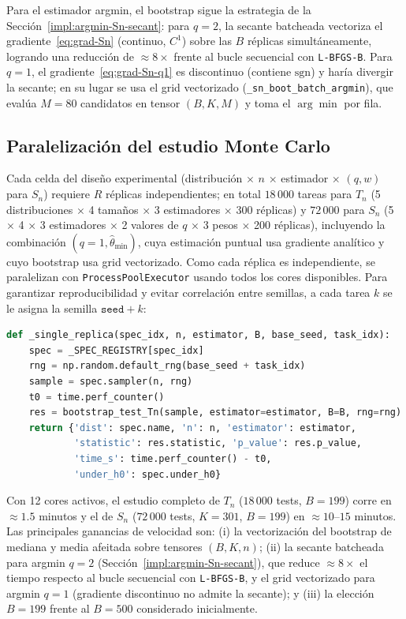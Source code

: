 Para el estimador argmin, el bootstrap sigue la estrategia de la Sección~\ref{impl:argmin-Sn-secant}: para $q=2$, la secante batcheada vectoriza el gradiente~\eqref{eq:grad-Sn} (continuo, $C^1$) sobre las $B$ réplicas simultáneamente, logrando una reducción de $\approx\!8\times$ frente al bucle secuencial con \texttt{L-BFGS-B}. Para $q=1$, el gradiente~\eqref{eq:grad-Sn-q1} es discontinuo (contiene $\mathrm{sgn}$) y haría divergir la secante; en su lugar se usa el grid vectorizado (\texttt{\_sn\_boot\_batch\_argmin}), que evalúa $M=80$ candidatos en tensor $(B,K,M)$ y toma el $\arg\min$ por fila.

\subsection{Paralelización del estudio Monte Carlo}

Cada celda del diseño experimental (distribución $\times$ $n$ $\times$ estimador $\times$ $(q,w)$ para $S_n$) requiere $R$ réplicas independientes; en total $18\,000$ tareas para $T_n$ (5 distribuciones $\times$ 4 tamaños $\times$ 3 estimadores $\times$ 300 réplicas) y $72\,000$ para $S_n$ (5 $\times$ 4 $\times$ 3 estimadores $\times$ 2 valores de $q$ $\times$ 3 pesos $\times$ 200 réplicas), incluyendo la combinación $(q{=}1,\hat\theta_{\min})$, cuya estimación puntual usa gradiente analítico y cuyo bootstrap usa grid vectorizado. Como cada réplica es independiente, se paralelizan con \texttt{ProcessPoolExecutor} usando todos los cores disponibles. Para garantizar reproducibilidad y evitar correlación entre semillas, a cada tarea $k$ se le asigna la semilla $\texttt{seed} + k$:

\begin{lstlisting}[language=Python]
def _single_replica(spec_idx, n, estimator, B, base_seed, task_idx):
    spec = _SPEC_REGISTRY[spec_idx]
    rng = np.random.default_rng(base_seed + task_idx)
    sample = spec.sampler(n, rng)
    t0 = time.perf_counter()
    res = bootstrap_test_Tn(sample, estimator=estimator, B=B, rng=rng)
    return {'dist': spec.name, 'n': n, 'estimator': estimator,
            'statistic': res.statistic, 'p_value': res.p_value,
            'time_s': time.perf_counter() - t0,
            'under_h0': spec.under_h0}
\end{lstlisting}
 Con 12 cores activos, el estudio completo de $T_n$ ($18\,000$ tests, $B=199$) corre en $\approx 1.5$ minutos y el de $S_n$ ($72\,000$ tests, $K=301$, $B=199$) en $\approx 10$--$15$ minutos. Las principales ganancias de velocidad son: (i) la vectorización del bootstrap de mediana y media afeitada sobre tensores $(B,K,n)$; (ii) la secante batcheada para argmin $q=2$ (Sección~\ref{impl:argmin-Sn-secant}), que reduce $\approx\!8\times$ el tiempo respecto al bucle secuencial con \texttt{L-BFGS-B}, y el grid vectorizado para argmin $q=1$ (gradiente discontinuo no admite la secante); y (iii) la elección $B=199$ frente al $B=500$ considerado inicialmente.

